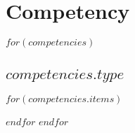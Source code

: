 \documentclass[11pt, a4paper]{article}
\newcommand{\commonspace}{2.1ex}
\begin{document}
\section{Competency}
$for(competencies)$
  \subsection{$competencies.type$}
  $for(competencies.items)$
    \begin{separator}
    \end{separator}
    \vspace{-\commonspace}
  $endfor$
$endfor$
\end{document}
